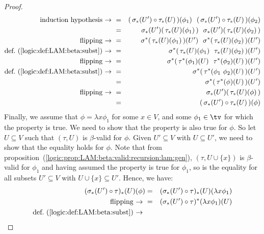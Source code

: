 \begin{proof}
\begin{eqnarray*}
            \mbox{induction hypothesis$\ \to\ $}
            &=&(\,\sigma_{*}(U')\circ\tau_{*}(U)\,)(\phi_{1})\ \ 
               (\,\sigma_{*}(U')\circ\tau_{*}(U)\,)(\phi_{2})\\
            &=&\sigma_{*}(U')(\,\tau_{*}(U)(\phi_{1})\,)\ \ 
               \sigma_{*}(U')(\,\tau_{*}(U)(\phi_{2})\,)\\
            \mbox{flipping\ $\to$\ }
            &=&\sigma^{*}(\,\tau_{*}(U)(\phi_{1})\,)(U')\ \ 
               \sigma^{*}(\,\tau_{*}(U)(\phi_{2})\,)(U')\\
            \mbox{def.~(\ref{logic:def:LAM:beta:subst})\ $\to$\ }
            &=&\sigma^{*}(\,\tau_{*}(U)(\phi_{1})\ \ 
                            \tau_{*}(U)(\phi_{2})\,)(U')\\ 
            \mbox{flipping\ $\to$\ }
            &=&\sigma^{*}(\,\tau^{*}(\phi_{1})(U)\ \ 
                            \tau^{*}(\phi_{2})(U)\,)(U')\\
            \mbox{def.~(\ref{logic:def:LAM:beta:subst})\ $\to$\ }
            &=&\sigma^{*}(\,\tau^{*}(\phi_{1}\ \phi_{2})(U)\,)(U')\\
            &=&\sigma^{*}(\,\tau^{*}(\phi)(U)\,)(U')\\
            \mbox{flipping\ $\to$\ }
            &=&\sigma_{*}(U')(\,\tau_{*}(U)(\phi)\,)\\
            &=&(\,\sigma_{*}(U')\circ\tau_{*}(U)\,)(\phi)
        \end{eqnarray*}
    Finally, we assume that $\phi=\lambda x\phi_{1}$ for some $x\in V$, and
    some $\phi_{1}\in\tv$ for which the property is true. We need to show
    that the property is also true for $\phi$. So let $U\subseteq V$ such 
    that $(\tau,U)$ is $\beta$-valid for $\phi$. Given $U'\subseteq V$  with
    $U\subseteq U'$, we need to show that the equality holds for $\phi$. 
    Note that from 
    proposition~(\ref{logic:prop:LAM:beta:valid:recursion:lam:gen}), 
    $(\tau, U\cup\{x\})$ is $\beta$-valid for $\phi_{1}$ and having assumed 
    the property is true for $\phi_{1}$, so is the equality for all subsets 
    $U'\subseteq V$ with $U\cup\{x\}\subseteq U'$. Hence, we have:
        \begin{eqnarray*}(\sigma_{*}(U')\circ\tau)_{*}(U)(\phi)
            &=&(\sigma_{*}(U')\circ\tau)_{*}(U)(\lambda x\phi_{1})\\
            \mbox{flipping\ $\to$\ }
            &=&(\sigma_{*}(U')\circ\tau)^{*}(\lambda x\phi_{1})(U)\\
            \mbox{def.~(\ref{logic:def:LAM:beta:subst})\ $\to$\ }

\end{eqnarray*}
\end{proof}

